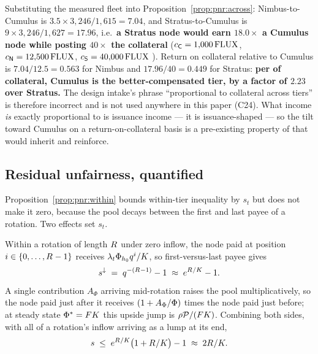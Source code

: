 \begin{remark}
\label{rem:pnr:c24}
Substituting the measured fleet into Proposition~\ref{prop:pnr:across}:
Nimbus-to-Cumulus is $3.5 \times 3{,}246/1{,}615 = 7.04$, and Stratus-to-Cumulus is
$9 \times 3{,}246/1{,}627 = 17.96$, i.e.\ \textbf{a Stratus node would earn $18.0\times$ a Cumulus
node while posting $40\times$ the collateral} ($c_{\mathsf{C}} = 1{,}000\,\mathrm{FLUX}$,
$c_{\mathsf{N}} = 12{,}500\,\mathrm{FLUX}$, $c_{\mathsf{S}} = 40{,}000\,\mathrm{FLUX}$
). Return on collateral relative to Cumulus is
$7.04/12.5 = 0.563$ for Nimbus and $17.96/40 = 0.449$ for Stratus: \textbf{per \flux of collateral,
Cumulus is the better-compensated tier, by a factor of $2.23$ over Stratus.} The design intake's
phrase ``proportional to collateral across tiers'' is therefore incorrect and is not used anywhere
in this paper  (C24). What \PNR income \emph{is} exactly
proportional to is \PoN issuance income --- it is issuance-shaped --- so the tilt toward Cumulus on a
return-on-collateral basis is a pre-existing property of \PoN that \PNR would inherit and reinforce.
\end{remark}

\subsection{Residual unfairness, quantified}
\label{sec:pnr:residual}

Proposition~\ref{prop:pnr:within} bounds within-tier inequality by $s_t$ but does not make it zero,
because the pool decays between the first and last payee of a rotation. Two effects set $s_t$.

\begin{proposition}
\label{prop:pnr:spread}
Within a rotation of length $R_{}$ under zero inflow, the node paid at position $i \in
\{0,\dots,R_{}-1\}$ receives $\lambda_{t}\Phi_{h_0}q^{i}/K$, so first-versus-last payee
gives
\[
  s^{\downarrow} \;=\; q^{-(R_{}-1)} - 1 \;\approx\; e^{R_{}/K} - 1 .
\]
A single contribution $A_\Phi$ arriving mid-rotation raises the pool multiplicatively, so the node
paid just after it receives $(1 + A_\Phi/\Phi)$ times the node paid just before; at steady state
$\Phi^{*} = FK$ this upside jump is $\rho\mathcal{P}/(FK)$. Combining both sides, with all
of a rotation's inflow arriving as a lump at its end,
\[
  s \;\le\; e^{R_{}/K}\big(1 + R_{}/K\big) - 1 \;\approx\; 2R_{}/K .
\]
\end{proposition}

